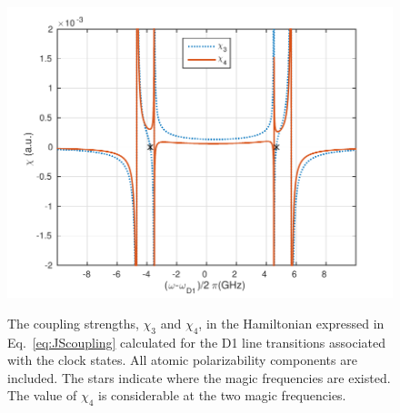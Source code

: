 \begin{figure}[!tbp]
\begin{minipage}{.91\linewidth}
\centering
{\includegraphics[scale=0.75]{../media/Figs/chi34_total}}
\end{minipage}
\caption[The coupling strengths in the birefringence-interaction Hamiltonian 
calculated for the D1 line transitions associated with the clock states to find the magic frequencies.]{The coupling strengths, $ \chi_3 $ and $ \chi_4 $, in the Hamiltonian 
expressed in Eq.~\eqref{eq:JScoupling} calculated for the D1 line transitions associated with the clock states.
All atomic polarizability components are included. The stars indicate where the magic frequencies are existed. The value of $ \chi_4 $ is considerable at the two magic frequencies.}  
\label{fig:chi34_total}
\end{figure}
